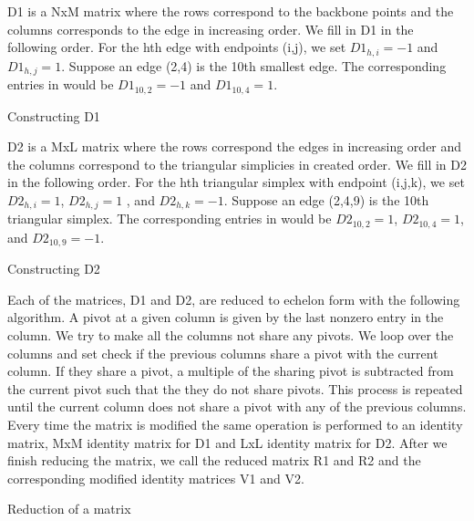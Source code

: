 \documentclass[12pt, a4paper, twocolumn, fullpage]{article}
\theoremstyle{plain}
\theoremstyle{definition}
\theoremstyle{remark}
\begin{document}
D1 is a  NxM matrix where the rows correspond to the backbone points and the columns corresponds to the edge in increasing order. We fill in D1 in the following order. For the hth  edge with endpoints (i,j), we set $D1_{h,i} = -1$ and $D1_{h,j} = 1$. Suppose an edge (2,4) is the 10th smallest edge. The corresponding entries in would be $D1_{10,2}=-1$ and $D1_{10,4}=1$.

\begin{algorithm}
\caption{Constructing D1}
\begin{algorithmic}
\ENDFOR
\end{algorithmic}
\end{algorithm}

D2 is a MxL matrix where the rows correspond the edges in increasing order and the columns correspond to the triangular simplicies in created order. We fill in D2 in the following order. For the hth triangular simplex with endpoint (i,j,k), we set $D2_{h,i} = 1$, $D2_{h,j} = 1$ , and $D2_{h,k} = -1$. Suppose an edge (2,4,9) is the 10th triangular simplex. The corresponding entries in would be $D2_{10,2}=1$, $D2_{10,4}=1$, and $D2_{10,9}=-1$. 

\begin{algorithm}
\caption{Constructing D2}
\begin{algorithmic}
\ENDFOR
\end{algorithmic}
\end{algorithm}

Each of the matrices, D1 and D2, are reduced to echelon form with the following algorithm. A pivot at a given column is given by the last nonzero entry in the column. We try to make all the columns not share any pivots. We loop over the columns and set check if the previous columns share a pivot with the current column. If they share a pivot, a multiple of the sharing pivot is subtracted from the current pivot such that the they do not share pivots. This process is repeated until the current column does not share a pivot with any of the previous columns. Every time the matrix is modified the same operation is performed to an identity matrix, MxM identity matrix for D1 and LxL identity matrix for D2. After we finish reducing the matrix, we call the reduced matrix R1 and R2 and the corresponding modified identity matrices V1 and V2.

\begin{algorithm}
\caption{Reduction of a matrix}
\begin{algorithmic}
        \ENDIF
    \ENDFOR 
\ENDFOR
\end{algorithmic}
\end{algorithm}
\end{document}

